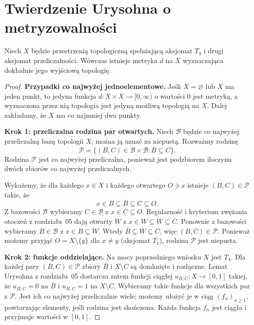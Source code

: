 \section{Twierdzenie Urysohna o metryzowalności}
\label{sec:topog-urysohn-metryzowalnosc}

\begin{twierdzenie}
\label{thm:topog-urysohn-metryzowalnosc}
Niech $X$ będzie przestrzenią topologiczną spełniającą
aksjomat $T_3$ i drugi aksjomat przeliczalności.
Wówczas istnieje metryka $d$ na $X$ wyznaczająca
dokładnie jego wyjściową topologię.
\end{twierdzenie}
\begin{proof}
\textbf{Przypadki co najwyżej jednoelementowe.}
Jeśli $X=\varnothing$ lub $X$ ma jeden punkt, to
jedyna funkcja $d\colon X\times X\to[0,\infty)$
o wartości $0$ jest metryką, a wyznaczona przez nią
topologia jest jedyną możliwą topologią na $X$.
Dalej zakładamy, że $X$ ma co najmniej dwa punkty.

\textbf{Krok 1: przeliczalna rodzina par otwartych.}
Niech $\mathcal B$ będzie co najwyżej przeliczalną
bazą topologii $X$; można ją uznać za niepustą.
Rozważmy rodzinę
\[
\mathcal P=\{(B,C)\in\mathcal B\times\mathcal B:
\overline B\subseteq C\}.
\]
Rodzina $\mathcal P$ jest co najwyżej przeliczalna,
ponieważ jest podzbiorem iloczynu dwóch zbiorów
co najwyżej przeliczalnych.

Wykażemy, że dla każdego $x\in X$ i każdego
otwartego $O\ni x$ istnieje $(B,C)\in\mathcal P$ takie, że
\[
 x\in B\subseteq\overline B\subseteq C\subseteq O.
\]
Z bazowości $\mathcal B$ wybieramy $C\in\mathcal B$
z $x\in C\subseteq O$. Regularność i kryterium zwężania
otoczeń z rozdziału~05 dają otwarty $W$ z
$x\in W\subseteq\overline W\subseteq C$.
Ponownie z bazowości wybieramy $B\in\mathcal B$
z $x\in B\subseteq W$. Wtedy
$\overline B\subseteq\overline W\subseteq C$,
więc $(B,C)\in\mathcal P$. Ponieważ możemy
przyjąć $O=X\setminus\{y\}$ dla $x\ne y$ (aksjomat
$T_1$), rodzina $\mathcal P$ jest niepusta.

\textbf{Krok 2: funkcje oddzielające.}
Na mocy poprzedniego wniosku $X$ jest $T_4$.
Dla każdej pary $(B,C)\in\mathcal P$ zbiory
$\overline B$ i $X\setminus C$ są domknięte i rozłączne.
Lemat Urysohna z rozdziału~05 dostarcza zatem
funkcji ciągłej
$u_{B,C}\colon X\to[0,1]$ takiej, że
$u_{B,C}=0$ na $\overline B$ i $u_{B,C}=1$
na $X\setminus C$.
Wybieramy takie funkcje dla wszystkich par
z $\mathcal P$. Jest ich co najwyżej przeliczalnie wiele;
możemy ułożyć je w ciąg $(f_n)_{n\ge1}$,
powtarzając elementy, jeśli rodzina jest skończona.
Każda funkcja $f_n$ jest ciągła i przyjmuje wartości w $[0,1]$.


\end{proof}
